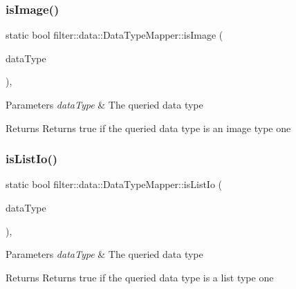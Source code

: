 \subsubsection{\texorpdfstring{is\+Image()}{isImage()}}
{\footnotesize\ttfamily static bool filter\+::data\+::\+Data\+Type\+Mapper\+::is\+Image (\begin{DoxyParamCaption}\item[{const I\+O\+Data\+Type \&}]{data\+Type }\end{DoxyParamCaption})\hspace{0.3cm}{\ttfamily [inline]}, {\ttfamily [static]}}


\begin{DoxyParams}{Parameters}
{\em data\+Type} & The queried data type \\
\hline
\end{DoxyParams}
\begin{DoxyReturn}{Returns}
Returns true if the queried data type is an image type one 
\end{DoxyReturn}
\mbox{\label{classfilter_1_1data_1_1_data_type_mapper_a60c8bd400abf2405d068dd09851e6717}} 
\subsubsection{\texorpdfstring{is\+List\+Io()}{isListIo()}}
{\footnotesize\ttfamily static bool filter\+::data\+::\+Data\+Type\+Mapper\+::is\+List\+Io (\begin{DoxyParamCaption}\item[{const I\+O\+Data\+Type \&}]{data\+Type }\end{DoxyParamCaption})\hspace{0.3cm}{\ttfamily [inline]}, {\ttfamily [static]}}


\begin{DoxyParams}{Parameters}
{\em data\+Type} & The queried data type \\
\hline
\end{DoxyParams}
\begin{DoxyReturn}{Returns}
Returns true if the queried data type is a list type one 
\end{DoxyReturn}
\mbox{\label{classfilter_1_1data_1_1_data_type_mapper_a7ca7334cdd806a1ce9680d198a0287e6}} 
